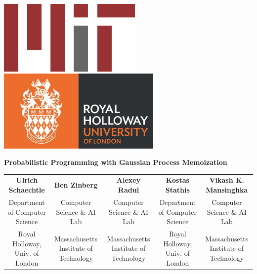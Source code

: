 \documentclass[a0,portrait]{a0poster}
\begin{document}

\begin{flushright}
\begin{minipage}[b]{0.25\linewidth}
\includegraphics[width=7cm]{mitlogo.png}
\hspace{1cm}
\includegraphics[width=8cm]{royalhollowaylogo.jpg}
\end{minipage} 
\end{flushright}

\vspace{2cm}

\begin{center}
\addtolength{\tabcolsep}{5pt} 
\veryHuge \textbf{Probabilistic Programming with Gaussian Process Memoization} \color{Black}\\[1.5cm] %
 \large   \begin{tabular}{  c  c  c c c}
           \textbf{Ulrich Schaechtle}  & \textbf{Ben Zinberg} & \textbf{Alexey Radul} & \textbf{Kostas Stathis}& \textbf{Vikash K. Mansinghka}\\ 
           Department of Computer Science & Computer Science \& AI Lab & Computer Science \& AI Lab & Department of Computer Science & Computer Science \& AI Lab \\
           Royal Holloway, Univ. of London & Massachusetts Institute of Technology & Massachusetts Institute of Technology & Royal Holloway, Univ. of London & Massachusetts Institute of Technology \\
        \end{tabular}

\addtolength{\tabcolsep}{-2pt} 
\end{center}
\end{document}
